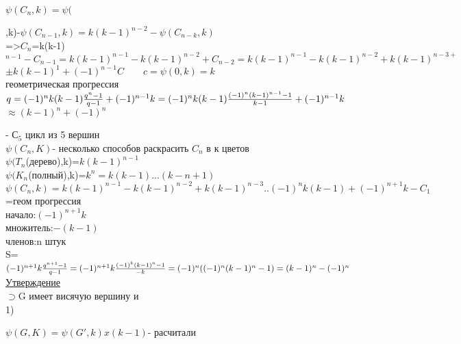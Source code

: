 \documentclass{article}
\begin{document}
$\psi(C_n,k)=\psi($,k)-$\psi(C_{n-1},k)=k(k-1)^{n-2}-\psi(C_{n-k},k)$\\
=>$C_n$=k(k-1)$^{n-1}-C_{n-1}=k(k-1)^{n-1}-k(k-1)^{n-2}+C_{n-2}=k(k-1)^{n-1}-k(k-1)^{n-2}+k(k-1)^{n-3+}$\\
$\pm k(k-1)^1+(-1)^{n-1}C \qquad c=\psi(0,k)=k$\\
геометрическая прогрессия\\
$q=(-1)^n k(k-1) \frac{q^n-1}{q-1}+(-1)^{n-1}k=(-1)^nk(k-1)\frac{(-1)^n(k-1)^{n-1}-1}{k-1}+(-1)^{n-1}k\\$
$\approx (k-1)^n+(-1)^n$\\
- С$_5$ цикл из 5 вершин\\
$\psi (C_n,K)$- несколько способов раскрасить $C_n$ в к цветов\\
$\psi (T_n$(дерево),k)=$k(k-1)^{n-1}$\\
$\psi (K_n$(полный),k)=$k^n=k(k-1)...(k-n+1)$\\
$\psi(C_n,k)=k(k-1)^{n-1}-k(k-1)^{n-2}+k(k-1)^{n-3}..(-1)^n k(k-1)+ (-1)^{n+1}k-C_1$\\
=геом прогрессия\\
начало:$(-1)^{n+1}k$\\
множитель:$-(k-1)$\\
членов:n штук\\
S=$(-1)^{n+1}k\frac{q^{n+1}-1}{q-1}\\=(-1)^{n+1}k\frac{(-1)^k (k-1)^n -1}{-k}=(-1)^n((-1)^n(k-1)^n-1) =(k-1)^n-(-1)^n$\\
\underline{Утверждение}\\
$\supset$G имеет висячую вершину и\\
1)\\  $\psi(G,K)=\psi(G',k)x(k-1)$- расчитали\\
\end{document}
